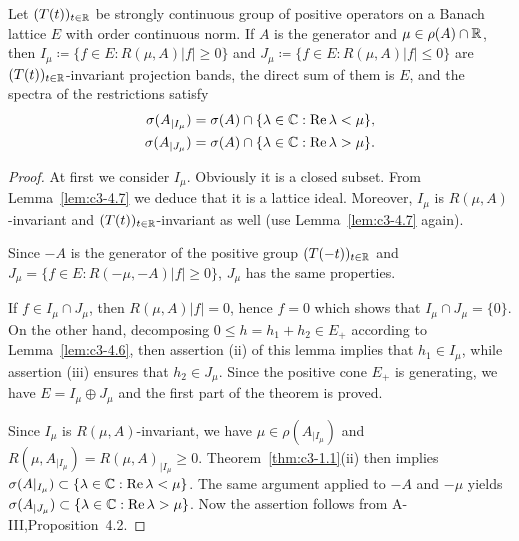 \begin{theorem} \label{thm:c3-4.8}
Let $(T(t))_{t \in \mathbb{R} }$ be strongly continuous group of positive
operators on a Banach lattice $E$ with order continuous norm.
If $A$ is the generator and $\mu \in \rho(A) \cap \mathbb{R} $, then
$I_{\mu} \coloneqq  \{f \in E : R(\mu,A)|f| \geq 0\}$ and $J_{\mu} \coloneqq  \{f \in E : R(\mu,A)|f| \leq 0\}$
are $(T(t))_{t \in \mathbb{R} }$-invariant projection bands, the direct sum of them
%
%
is $E$, and the spectra of the restrictions satisfy
\begin{align*}
	\sigma(A_{|I_{\mu}}) &= \sigma(A) \cap \{\lambda \in \mathbb{C}  : \mathop{}\!\mathrm{Re}\, \lambda < \mu\} ,\\
	\sigma(A_{|J_{\mu}}) &= \sigma(A) \cap \{\lambda \in \mathbb{C}  : \mathop{}\!\mathrm{Re}\, \lambda > \mu\} .
\end{align*}
\end{theorem}

\begin{proof}
At first we consider $I_{\mu}$. Obviously it is a closed subset.
From Lemma~\ref{lem:c3-4.7} we deduce that it is a lattice ideal. Moreover, $I_{\mu}$
is $R(\mu,A)$-invariant and $(T(t))_{t \in \mathbb{R} }$-invariant as well (use Lemma~\ref{lem:c3-4.7}
again).

Since $-A$ is the generator of the positive group $(T(-t))_{t \in \mathbb{R} }$ and
$J_{\mu} = \{f \in E : R(-\mu,-A)|f| \geq 0\}$, $J_{\mu}$ has the same properties.

If $f \in I_{\mu} \cap J_{\mu}$, then $R(\mu,A)|f| = 0$, hence $f = 0$ which shows that
$I_{\mu} \cap J_{\mu} = \{0\}$. On the other hand, decomposing $0 \leq h = h_1 + h_2 \in E_+$
according to Lemma~\ref{lem:c3-4.6}, then assertion (ii) of this lemma implies
that $h_1 \in I_{\mu}$, while assertion (iii) ensures that $h_2 \in J_{\mu}$. Since the
positive cone $E_+$ is generating, we have $E = I_{\mu} \oplus J_{\mu}$ and the first part
of the theorem is proved.

Since $I_{\mu}$ is $R(\mu,A)$-invariant, we have $\mu \in \rho(A_{|I_{\mu}})$ and
$R(\mu,A_{|I_{\mu}}) = R(\mu,A)_{|I_{\mu}} \geq 0$. Theorem~\ref{thm:c3-1.1}(ii) then implies
$\sigma(A|_{I_{\mu}}) \subset \{\lambda \in \mathbb{C}  : \mathop{}\!\mathrm{Re}\, \lambda < \mu\}$. The same argument applied to $-A$ and
$-\mu$ yields $\sigma(A_{|J_{\mu}}) \subset \{\lambda \in \mathbb{C}  : \mathop{}\!\mathrm{Re}\, \lambda > \mu\}$. Now the assertion follows
from A-III,Proposition~4.2.
\end{proof}

